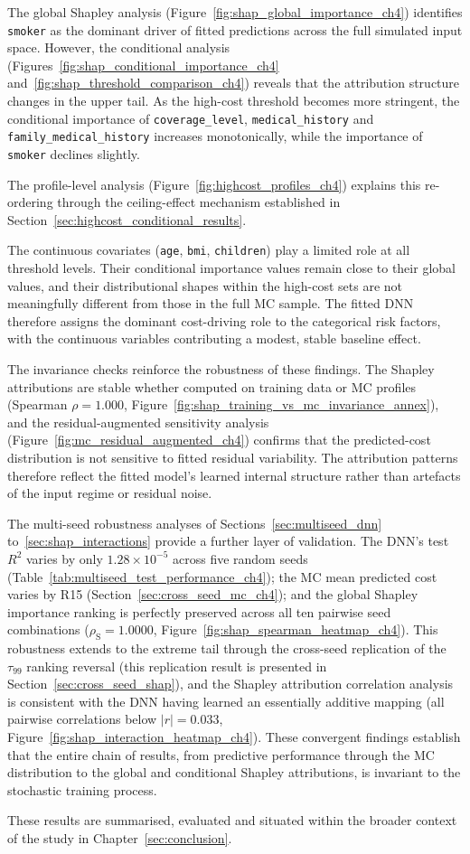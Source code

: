 The global Shapley analysis
(Figure~\ref{fig:shap_global_importance_ch4}) identifies
\texttt{smoker} as the dominant driver of fitted predictions across
the full simulated input space. However, the conditional analysis
(Figures~\ref{fig:shap_conditional_importance_ch4}
and~\ref{fig:shap_threshold_comparison_ch4}) reveals that the
attribution structure changes in the upper tail. As the high-cost
threshold becomes more stringent, the conditional importance of
\texttt{coverage\_\allowbreak{}level}, \texttt{medical\_\allowbreak{}history} and
\texttt{family\_medical\_\allowbreak{}history} increases monotonically, while the
importance of \texttt{smoker} declines slightly.

The profile-level analysis
(Figure~\ref{fig:highcost_profiles_ch4}) explains this re-ordering
through the ceiling-effect mechanism established in
Section~\ref{sec:highcost_conditional_results}.

The continuous covariates (\texttt{age}, \texttt{bmi},
\texttt{children}) play a limited role at all threshold levels. Their
conditional importance values remain close to their global values, and
their distributional shapes within the high-cost sets are not
meaningfully different from those in the full MC sample. The
fitted DNN therefore assigns the dominant cost-driving role to
the categorical risk factors, with the continuous variables contributing
a modest, stable baseline effect.

The invariance checks reinforce the robustness of these findings. The
Shapley attributions are stable whether computed on training data or
MC profiles (Spearman $\rho = 1.000$,
Figure~\ref{fig:shap_training_vs_mc_invariance_annex}), and the
residual-augmented sensitivity analysis
(Figure~\ref{fig:mc_residual_augmented_ch4}) confirms that the
predicted-cost distribution is not sensitive to fitted residual
variability. The attribution patterns therefore reflect the fitted
model's learned internal structure rather than artefacts of the input
regime or residual noise.

The multi-seed robustness analyses of
Sections~\ref{sec:multiseed_dnn} to~\ref{sec:shap_interactions} provide a
further layer of validation.  The DNN's test $R^2$ varies by only
$1.28 \times 10^{-5}$ across five random seeds
(Table~\ref{tab:multiseed_test_performance_ch4}); the MC mean
predicted cost varies by R15 (Section~\ref{sec:cross_seed_mc_ch4}); and
the global Shapley importance ranking is perfectly preserved across all
ten pairwise seed combinations ($\rho_{\mathrm{S}} = 1.0000$,
Figure~\ref{fig:shap_spearman_heatmap_ch4}).  This robustness extends
to the extreme tail through the cross-seed replication of the
$\tau_{99}$ ranking reversal (this replication result is presented in
Section~\ref{sec:cross_seed_shap}), and the Shapley attribution
correlation analysis is consistent with the DNN having learned an
essentially additive mapping (all pairwise correlations below
$|r| = 0.033$, Figure~\ref{fig:shap_interaction_heatmap_ch4}).  These convergent
findings establish that the entire chain of results, from predictive
performance through the MC distribution to the global and
conditional Shapley attributions, is invariant to the stochastic training
process.

These results are summarised, evaluated and situated within the broader
context of the study in Chapter~\ref{sec:conclusion}.

